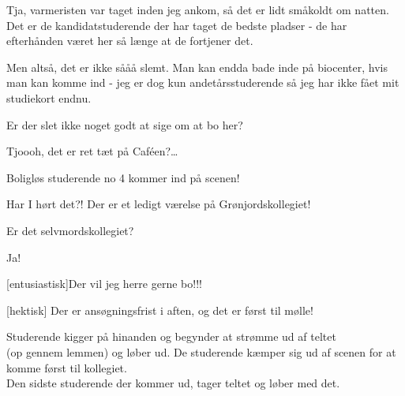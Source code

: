 \documentclass[a4paper,12pt]{article}
\begin{document}
\begin{sketch}
Tja, varmeristen var taget inden jeg ankom, så det er lidt småkoldt om natten. Det er de kandidatstuderende der har taget de bedste pladser - de har efterhånden været her så længe at de fortjener det.

Men altså, det er ikke sååå slemt. Man kan endda bade inde på biocenter, hvis man kan komme ind - jeg er dog kun andetårsstuderende så jeg har ikke fået mit studiekort endnu.

 Er der slet ikke noget godt at sige om at bo her?

Tjoooh, det er ret tæt på Caféen?\ldots

\scene Boligløs studerende no 4 kommer ind på scenen!

 Har I hørt det?! Der er et ledigt værelse på Grønjordskollegiet!

 Er det selvmordskollegiet?

 Ja!

[entusiastisk]Der vil jeg herre gerne bo!!! 

[hektisk] Der er ansøgningsfrist i aften, og det er først til mølle!

\scene Studerende kigger på hinanden og begynder at strømme ud af teltet\\
(op gennem lemmen) og løber ud. De studerende kæmper sig ud af scenen for at komme først til kollegiet.\\

\scene Den sidste studerende der kommer ud, tager teltet og løber med det.




\end{sketch}
\end{document}
